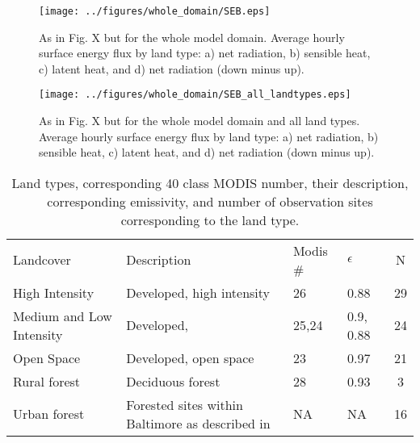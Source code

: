 \documentclass[draft,linenumbers]{agujournal}
\begin{document}
\begin{figure}[h]
\centering
\texttt{[image: ../figures/whole\_domain/SEB.eps]}
\caption{As in Fig. X but for the whole model domain. Average hourly surface energy flux by land type: a) net radiation, b) sensible heat, c) latent heat, and d) net radiation (down minus up).}
\label{fig:seb_wd}
\end{figure}

\begin{figure}[h]
\centering
\texttt{[image: ../figures/whole\_domain/SEB\_all\_landtypes.eps]}
\caption{As in Fig. X but for the whole model domain and all land types. Average hourly surface energy flux by land type: a) net radiation, b) sensible heat, c) latent heat, and d) net radiation (down minus up).}
\label{fig:seb_wd}
\end{figure}

%
\begin{table}
\centering
\begin{tabular}{l l l l c}
Landcover & Description &  Modis \# & $\epsilon$ & N  \\
High Intensity & Developed, high intensity & 26& 0.88 & 29 \\
Medium and Low Intensity & Developed, & 25,24& 0.9, 0.88 & 24\\
Open Space& Developed, open space &23 & 0.97 &  21\\
Rural forest&Deciduous forest & 28& 0.93& 3\\
Urban forest& Forested sites within Baltimore as described in \cite{} &NA & NA & 16\\
\end{tabular}
\caption{Land types, corresponding 40 class MODIS number, their description, corresponding emissivity, and number of observation sites corresponding to the land type.}
\label{tab:lcc}
\end{table}
\end{document}
